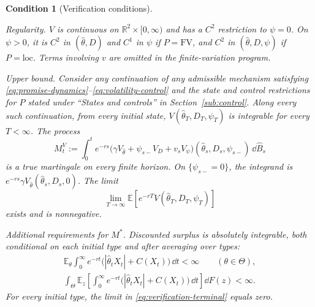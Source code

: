 \documentclass[12pt]{article}
\newtheorem{condition}{Condition}
\newcommand{\E}{\mathbb{E}}
\newcommand{\hth}{\hat\theta}
\newcommand{\hB}{\hat B}
\begin{document}
\begin{condition}[Verification conditions]
\label{cond:verification}

\emph{Regularity.}
\(V\) is continuous on \(\mathbb R^2\times[0,\infty)\)
and has a \(C^2\) restriction to \(\psi=0\).
On \(\psi>0\), it is \(C^2\) in \((\hth,D)\) and \(C^1\)
in \(\psi\) if \(P=\mathrm{FV}\), and \(C^2\) in
\((\hth,D,\psi)\) if \(P=\mathrm{loc}\).
Terms involving \(v\) are omitted in the finite-variation program.

\emph{Upper bound.}
Consider any continuation of any admissible mechanism satisfying
\eqref{eq:promise-dynamics}--\eqref{eq:volatility-control}
and the state and control restrictions for \(P\) stated under
``States and controls'' in Section~\ref{sub:control}.
Along every such continuation, from every initial state,
\(V(\hth_T,D_T,\psi_T)\) is integrable for every \(T<\infty\).
The process
\begin{equation}\label{eq:verification-martingale}
  M_t^V
  :=
  \int_0^t e^{-rs}
  \bigl(\gamma V_{\hth}+\psi_{s-}V_D+v_sV_\psi\bigr)
  (\hth_s,D_s,\psi_{s-})\,\dd\hB_s
\end{equation}
is a true martingale on every finite horizon.
On \(\{\psi_{s-}=0\}\), the integrand is
\(e^{-rs}\gamma V_{\hth}(\hth_s,D_s,0)\).
The limit
\begin{equation}\label{eq:verification-terminal}
  \lim_{T\to\infty}
  \E\left[e^{-rT}V(\hth_T,D_T,\psi_T)\right]
\end{equation}
exists and is nonnegative.

\emph{Additional requirements for \(M^*\).}
Discounted surplus is absolutely integrable, both conditional
on each initial type and after averaging over types:
\begin{equation}\label{eq:verification-integrability}
\begin{gathered}
  \E_\theta\int_0^\infty e^{-rt}
  \bigl(|\hth_tX_t|+C(X_t)\bigr)\,\dd t<\infty
  \qquad(\theta\in\Theta),\\
  \int_\Theta\E_z\!\left[
    \int_0^\infty e^{-rt}
    \bigl(|\hth_tX_t|+C(X_t)\bigr)\,\dd t
  \right]\dd F(z)<\infty.
\end{gathered}
\end{equation}
For every initial type, the limit in
\eqref{eq:verification-terminal} equals zero.

\end{condition}



\newpage
\end{document}
